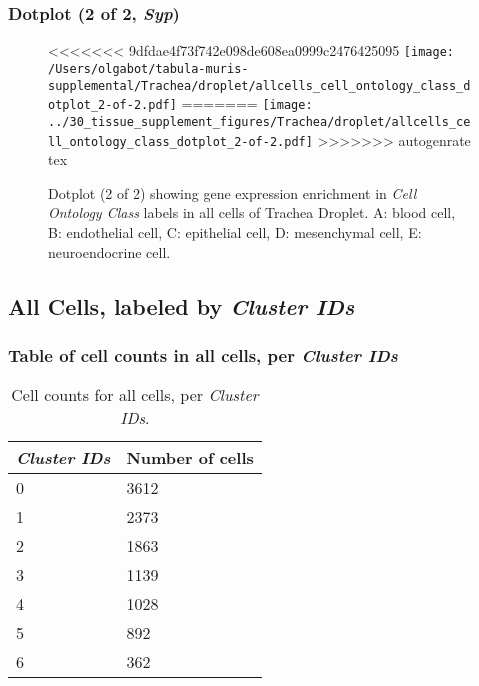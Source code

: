 \clearpage

\subsubsection{Dotplot (2 of 2, \emph{Syp})}
\begin{figure}[h]
\centering
<<<<<<< 9dfdae4f73f742e098de608ea0999c2476425095
\texttt{[image: /Users/olgabot/tabula-muris-supplemental/Trachea/droplet/allcells\_cell\_ontology\_class\_dotplot\_2-of-2.pdf]}
=======
\texttt{[image: ../30\_tissue\_supplement\_figures/Trachea/droplet/allcells\_cell\_ontology\_class\_dotplot\_2-of-2.pdf]}
>>>>>>> autogenrate tex

\caption{ Dotplot (2 of 2)  showing gene expression enrichment in \emph{Cell Ontology Class} labels in all cells of Trachea Droplet. A: blood cell, B: endothelial cell, C: epithelial cell, D: mesenchymal cell, E: neuroendocrine cell.}
\end{figure}


\clearpage

\subsection{All Cells, labeled by \emph{Cluster IDs}}
\subsubsection{Table of cell counts in all cells, per \emph{Cluster IDs}}\begin{table}[h]
\centering
\label{my-label}
\begin{tabular}{@{}ll@{}}
\toprule

\emph{Cluster IDs}& Number of cells \\ \midrule
0 & 3612 \\

1 & 2373 \\

2 & 1863 \\

3 & 1139 \\

4 & 1028 \\

5 & 892 \\

6 & 362 \\
\bottomrule
\end{tabular}
\caption{Cell counts for all cells, per \emph{Cluster IDs}.}
\end{table}

